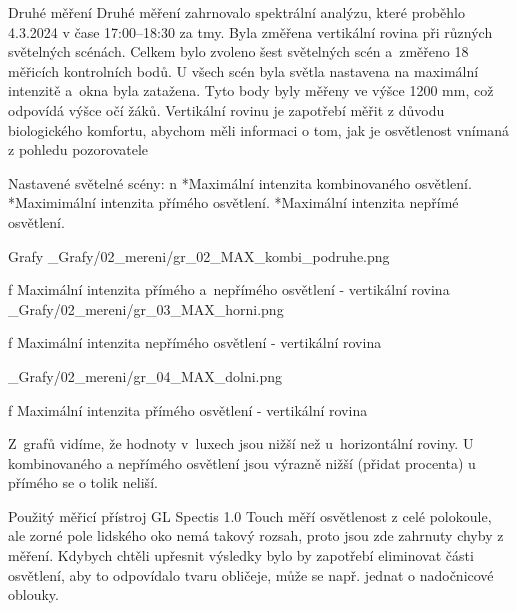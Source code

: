 \sec Druhé měření
Druhé měření zahrnovalo spektrální analýzu, které proběhlo 4.3.2024 v čase 17:00--18:30 za tmy.
Byla změřena vertikální rovina při různých světelných scénách.
Celkem bylo zvoleno šest světelných scén a~změřeno 18 měřicích kontrolních bodů. U všech scén byla světla nastavena na maximální intenzitě a~okna byla zatažena.
Tyto body byly měřeny ve výšce 1200 mm, což odpovídá výšce očí žáků. Vertikální
rovinu je zapotřebí měřit z důvodu biologického komfortu, abychom měli informaci
o tom, jak je osvětlenost vnímaná z pohledu pozorovatele

\medskip\noindent
{\sbf Nastavené světelné scény:}
\begitems \style n
    *Maximální intenzita kombinovaného osvětlení.
    *Maximimální intenzita přímého osvětlení.
    *Maximální intenzita nepřímé osvětlení.
\enditems

\secc Grafy
\medskip {}
\picw=15cm _Grafy/02_mereni/gr_02_MAX_kombi_podruhe.png
\caption/f Maximální intenzita přímého a~nepřímého osvětlení - vertikální rovina
\medskip {}
\picw=15cm _Grafy/02_mereni/gr_03_MAX_horni.png
\caption/f Maximální intenzita nepřímého osvětlení - vertikální rovina

\medskip {}
\picw=15cm _Grafy/02_mereni/gr_04_MAX_dolni.png
\caption/f Maximální intenzita přímého osvětlení - vertikální rovina
\medskip

Z~grafů vidíme, že hodnoty v~luxech jsou nižší než u~horizontální roviny. U kombinovaného a nepřímého osvětlení jsou výrazně nižší (přidat procenta)
u přímého se o tolik neliší.

Použitý měřicí přístroj GL Spectis 1.0 Touch měří osvětlenost z celé polokoule, ale zorné pole lidského oko nemá takový rozsah, proto
jsou zde zahrnuty chyby z měření. Kdybych chtěli upřesnit výsledky bylo by zapotřebí eliminovat části osvětlení, aby to odpovídalo tvaru obličeje, může se např.
jednat o nadočnicové oblouky.
\medskip



